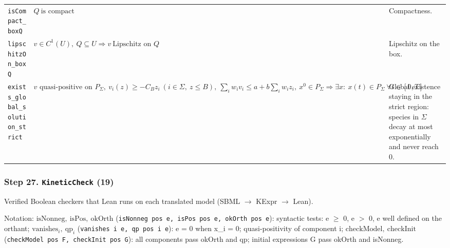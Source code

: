 {\begin{longtable}{@{}>{\raggedright\arraybackslash}p{3.6cm}>{\raggedright\arraybackslash}p{6.6cm}>{\raggedright\arraybackslash}p{5.6cm}@{}}
\texttt{isCompact\_\allowbreak{}boxQ} & $\displaystyle Q\ \text{is compact}$ & Compactness. \\[3pt]
\texttt{lipschitzOn\_\allowbreak{}boxQ} & $\displaystyle v\in C^1(U),\ Q\subseteq U\Rightarrow v\ \text{Lipschitz on }Q$ & Lipschitz on the box. \\[3pt]
\texttt{exists\_\allowbreak{}global\_\allowbreak{}solution\_\allowbreak{}strict} & $\displaystyle v\text{ quasi-positive on }P_\Sigma,\ v_i(z)\ge-C_Bz_i\ (i\in\Sigma,\ z\le B),\ \sum_iw_iv_i\le a+b\sum_iw_iz_i,\ x^0\in P_\Sigma\Rightarrow\exists x:\ x(t)\in P_\Sigma\ \forall t\in[0,T]$ & Global existence staying in the strict region: species in $\Sigma$ decay at most exponentially and never reach 0. \\[3pt]
\bottomrule
\end{longtable}
}

\subsubsection*{Step 27. \texttt{KineticCheck} (19)}
Verified Boolean checkers that Lean runs on each translated model (SBML $\to$ KExpr $\to$ Lean).

{\small\raggedright Notation: $\mathrm{isNonneg},\ \mathrm{isPos},\ \mathrm{okOrth}$ (\texttt{isNonneg pos e, isPos pos e, okOrth pos e}): syntactic tests: e $\ge$ 0, e $>$ 0, e well defined on the orthant; $\mathrm{vanishes}_i,\ \mathrm{qp}_i$ (\texttt{vanishes i e, qp pos i e}): e = 0 when x\_i = 0; quasi-positivity of component i; $\mathrm{checkModel},\ \mathrm{checkInit}$ (\texttt{checkModel pos F, checkInit pos G}): all components pass okOrth and qp; initial expressions G pass okOrth and isNonneg.}

